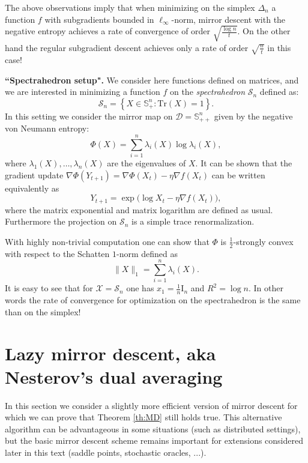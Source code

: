 \documentclass[openany]{now}
\newcommand{\mI}{\mathrm{I}}
\begin{document}
The above observations imply that when minimizing on the simplex $\Delta_n$ a function $f$ with subgradients bounded in $\ell_{\infty}$-norm, mirror descent with the negative entropy achieves a rate of convergence of order $\sqrt{\frac{\log n}{t}}$. On the other hand the regular subgradient descent achieves only a rate of order $\sqrt{\frac{n}{t}}$ in this case!
\newline

\noindent
\textbf{``Spectrahedron setup".} We consider here functions defined on matrices, and we are interested in minimizing a function $f$ on the {\em spectrahedron} $\mathcal{S}_n$ defined as:
$$\mathcal{S}_n = \left\{X \in \mathbb{S}_+^n : \mathrm{Tr}(X) = 1 \right\} .$$
In this setting we consider the mirror map on $\mathcal{D} = \mathbb{S}_{++}^n$ given by the negative von Neumann entropy:
$$\Phi(X) = \sum_{i=1}^n \lambda_i(X) \log \lambda_i(X) ,$$
where $\lambda_1(X), \hdots, \lambda_n(X)$ are the eigenvalues of $X$. It can be shown that the gradient update $\nabla \Phi(Y_{t+1}) = \nabla \Phi(X_t) - \eta \nabla f(X_t)$ can be written equivalently as
$$Y_{t+1} = \exp\big(\log X_t - \eta \nabla f(X_t) \big) ,$$
where the matrix exponential and matrix logarithm are defined as usual. Furthermore the projection on $\mathcal{S}_n$ is a simple trace renormalization.

With highly non-trivial computation one can show that $\Phi$ is $\frac{1}{2}$-strongly convex with respect to the Schatten $1$-norm defined as
$$\|X\|_1 = \sum_{i=1}^n \lambda_i(X).$$
It is easy to see that for $\mathcal{X} = \mathcal{S}_n$ one has $x_1 = \frac{1}{n} \mI_n$ and $R^2 = \log n$. In other words the rate of convergence for optimization on the spectrahedron is the same than on the simplex!

\section{Lazy mirror descent, aka Nesterov's dual averaging}
In this section we consider a slightly more efficient version of mirror descent for which we can prove that Theorem \ref{th:MD} still holds true. This alternative algorithm can be advantageous in some situations (such as distributed settings), but the basic mirror descent scheme remains important for extensions considered later in this text (saddle points, stochastic oracles, ...). 
\end{document}
